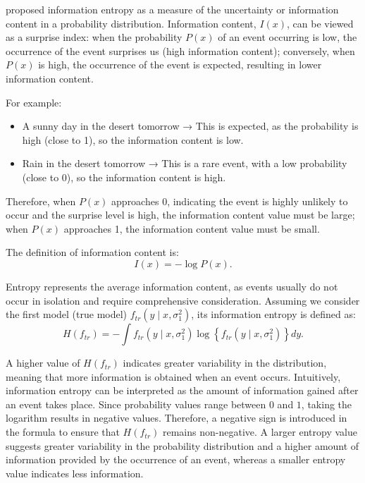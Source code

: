 \hspace*{8mm} \cite{shannon1948mathematical} proposed information entropy as a measure of the uncertainty or information content in a probability distribution. Information content, $I(x)$, can be viewed as a surprise index: when the probability $P(x)$ of an event occurring is low, the occurrence of the event surprises us (high information content); conversely, when $P(x)$ is high, the occurrence of the event is expected, resulting in lower information content.

For example:

\begin{itemize}
\item A sunny day in the desert tomorrow → This is expected, as the probability is high (close to 1), so the information content is low.
\item Rain in the desert tomorrow → This is a rare event, with a low probability (close to 0), so the information content is high.
\end{itemize}

\hspace*{8mm} Therefore, when $P(x)$ approaches 0, indicating the event is highly unlikely to occur and the surprise level is high, the information content value must be large; when $P(x)$ approaches 1, the information content value must be small.

The definition of information content is:
\begin{equation}\label{eq:information content}
I(x)=-\log P(x).
\end{equation}

\hspace*{8mm} Entropy represents the average information content, as events usually do not occur in isolation and require comprehensive consideration. Assuming we consider the first model (true model) $f_{tr}(y \mid x, \sigma^2_1)$, its information entropy is defined as:
\begin{equation}\label{eq:information entropy}
H(f_{tr}) = -\int f_{tr}(y \mid x, \sigma^2_1) \log \left\{f_{tr}(y \mid x, \sigma^2_1)\right\} dy.
\end{equation}

\hspace*{8mm} A higher value of $H(f_{tr})$ indicates greater variability in the distribution, meaning that more information is obtained when an event occurs. Intuitively, information entropy can be interpreted as the amount of information gained after an event takes place. Since probability values range between $0$ and $1$, taking the logarithm results in negative values. Therefore, a negative sign is introduced in the formula to ensure that $H(f_{tr})$ remains non-negative. A larger entropy value suggests greater variability in the probability distribution and a higher amount of information provided by the occurrence of an event, whereas a smaller entropy value indicates less information.


